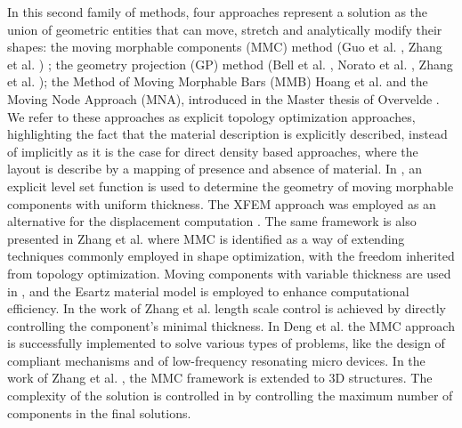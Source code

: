 In this second family of methods, four approaches represent a solution as the union of geometric entities that can move, stretch and analytically modify their shapes: the moving morphable components (MMC) method (Guo et al.  \cite{guo2014doing,guo2016explicit}, Zhang et al. \cite{zhang2016new,zhang2017new}) ; the geometry projection (GP) method (Bell et al. \cite{bell2012geometry}, Norato et al. \cite{norato2015geometry}, Zhang et al. \cite{zhang2016geometry}); the Method of Moving Morphable Bars (MMB) Hoang et al. \cite{hoang2017topology} and the Moving Node Approach (MNA), introduced in the Master thesis of Overvelde \cite{overvelde2012moving}. We refer to these approaches as explicit topology optimization approaches, highlighting the fact that the material description is explicitly described, instead of implicitly as it is the case for direct density based approaches, where the layout is describe by a mapping of presence and absence of material. In \cite{guo2014doing}, an explicit level set function is used to determine the geometry of moving morphable components with uniform thickness. The XFEM approach was employed as an alternative for the displacement computation \cite{kreissl2012levelset,van2007stress,wei2010study}. The same framework is also presented in Zhang et al. \cite{zhang2016lagrangian} where MMC is identified as a way of extending techniques commonly employed in shape optimization, with the freedom inherited from topology optimization.  Moving components with variable thickness are used in \cite{zhang2016new}, and the Esartz material model is employed to enhance computational efficiency. In the work of Zhang et al. \cite{zhang2016minimum} length scale control is achieved by directly controlling the component's minimal thickness.
In Deng et al. \cite{deng2016design} the MMC approach is successfully implemented to solve various types of problems, like the design of compliant mechanisms and of low-frequency resonating micro devices.
In the work of Zhang et al. \cite{zhang2017new}, the MMC framework is extended to 3D structures.
The complexity of the solution is controlled in \cite{zhang2017structural} by controlling the maximum number of components in the final solutions.

